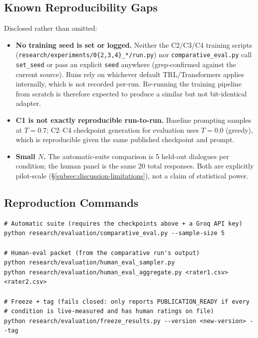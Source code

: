 \subsection{Known Reproducibility Gaps}
\label{subsec:appendix-gaps}
Disclosed rather than omitted:
\begin{itemize}
    \item \textbf{No training seed is set or logged.} Neither the C2/C3/C4 training scripts (\texttt{research/experiments/0\{2,3,4\}\_*/run.py}) nor \texttt{comparative\_eval.py} call \texttt{set\_seed} or pass an explicit \texttt{seed} anywhere (grep-confirmed against the current source). Runs rely on whichever default TRL/Transformers applies internally, which is not recorded per-run. Re-running the training pipeline from scratch is therefore expected to produce a similar but not bit-identical adapter.
    \item \textbf{C1 is not exactly reproducible run-to-run.} Baseline prompting samples at $T=0.7$; C2--C4 checkpoint generation for evaluation uses $T=0.0$ (greedy), which is reproducible given the same published checkpoint and prompt.
    \item \textbf{Small $N$.} The automatic-suite comparison is 5 held-out dialogues per condition; the human panel is the same 20 total responses. Both are explicitly pilot-scale (\S\ref{subsec:discussion-limitations}), not a claim of statistical power.
\end{itemize}

\subsection{Reproduction Commands}
\label{subsec:appendix-commands}
\begin{verbatim}
# Automatic suite (requires the checkpoints above + a Groq API key)
python research/evaluation/comparative_eval.py --sample-size 5

# Human-eval packet (from the comparative run's output)
python research/evaluation/human_eval_sampler.py
python research/evaluation/human_eval_aggregate.py <rater1.csv> <rater2.csv>

# Freeze + tag (fails closed: only reports PUBLICATION_READY if every
# condition is live-measured and has human ratings on file)
python research/evaluation/freeze_results.py --version <new-version> --tag
\end{verbatim}
